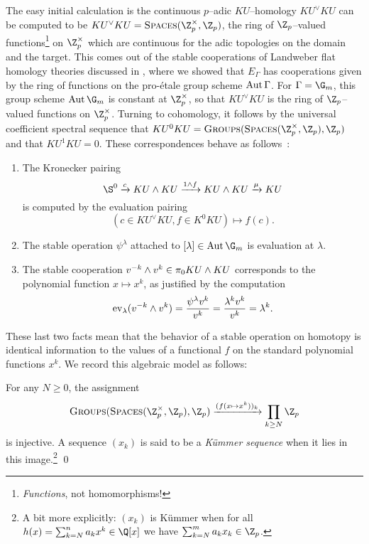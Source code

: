 The easy initial calculation is the continuous \(p\)--adic \(KU\)--homology \(KU^\vee KU\) can be computed to be \(KU^\vee KU = \CatOf{Spaces}(\Z_p^\times, \Z_p)\), the ring of \(\Z_p\)--valued functions\footnote{\emph{Functions}, not homomorphisms!} on \(\Z_p^\times\) which are continuous for the adic topologies on the domain and the target.  This comes out of the stable cooperations of Landweber flat homology theories discussed in , where we showed that \(E_\Gamma\) has cooperations given by the ring of functions on the pro-\'etale group scheme \(\operatorname{Aut} \Gamma\).  For \(\Gamma = \G_m\), this group scheme \(\Aut \G_m\) is constant at \(\Z_p^\times\), so that \(KU^\vee KU\) is the ring of \(\Z_p\)--valued functions on \(\Z_p^\times\).  Turning to cohomology, it follows by the universal coefficient spectral sequence that \(KU^0 KU = \CatOf{Groups}(\CatOf{Spaces}(\Z_p^\times, \Z_p), \Z_p)\) and that \(KU^1 KU = 0\).  These correspondences behave as follows~\cite{AHRMoments}:
\begin{enumerate}
    \item The Kronecker pairing \[\S^0 \xrightarrow{c} KU \sm KU \xrightarrow{1 \sm f} KU \sm KU \xrightarrow{\mu} KU\] is computed by the evaluation pairing \[(c \in KU^\vee KU, f \in K^0 KU) \mapsto f(c).\]
    \item The stable operation \(\psi^\lambda\) attached to \([\lambda] \in \Aut \G_m\) is evaluation at \(\lambda\).
    \item The stable cooperation \(v^{-k} \wedge v^k \in \pi_0 KU \wedge KU\) corresponds to the polynomial function \(x \mapsto x^k\), as justified by the computation \[\operatorname{ev}_{\lambda}(v^{-k} \wedge v^k) = \frac{\psi^\lambda v^k}{v^k} = \frac{\lambda^k v^k}{v^k} = \lambda^k.\]
\end{enumerate}

\noindent These last two facts mean that the behavior of a stable operation on homotopy is identical information to the values of a functional \(f\) on the standard polynomial functions \(x^k\).  We record this algebraic model as follows:
\begin{lemma}
For any \(N \ge 0\), the assignment \[\CatOf{Groups}(\CatOf{Spaces}(\Z_p^\times, \Z_p), \Z_p) \xrightarrow{(f(x \mapsto x^k))_k} \prod_{k \ge N} \Z_p\] is injective.  A sequence \((x_k)\) is said to be a \textit{K\"ummer sequence} when it lies in this image.\footnote{A bit more explicitly: \((x_k)\) is K\"ummer when for all \(h(x) = \sum_{k=N}^n a_k x^k \in \Q[x]\) we have \(\sum_{k=N}^m a_k x_k \in \Z_p\).} \qed
\end{lemma}

